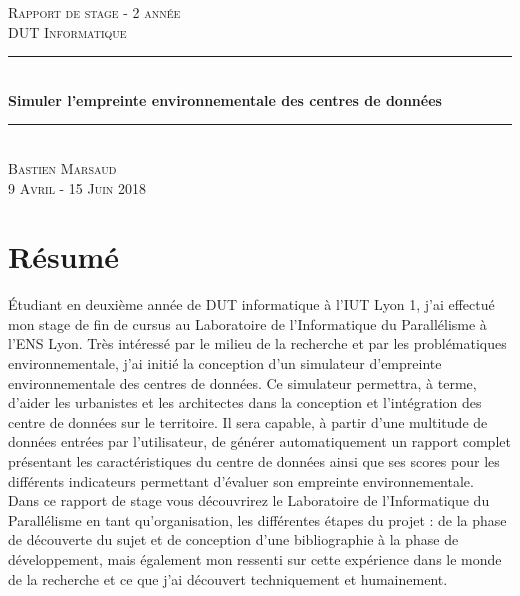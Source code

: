 \newpage\null\thispagestyle{empty}\newpage
\thispagestyle{licence}
\begin{spacing}{1}
	
	\newcommand{\HRule}{\rule{\linewidth}{0.5mm}}
	\begin{center}
		\textsc{\LARGE Rapport de stage - 2 année \\ DUT Informatique}\\
		\HRule \\[0.8cm]
		{ \huge \bfseries Simuler l'empreinte environnementale des centres de données}\\[0.4cm]
		\HRule \\[0.5cm]
		
		\textsc{\Large Bastien Marsaud}\\
		\textsc{\Large 9 Avril - 15 Juin 2018}\\
	\end{center}
	
	\hfill
	
	\section*{Résumé}
	Étudiant en deuxième année de DUT informatique à l'IUT Lyon 1, j'ai effectué mon stage de fin de cursus au Laboratoire de l'Informatique du Parallélisme à l'ENS Lyon. Très intéressé par le milieu de la recherche et par les problématiques environnementale, j'ai initié la conception d'un simulateur d'empreinte environnementale des centres de données. Ce simulateur permettra, à terme, d'aider les urbanistes et les architectes dans la conception et l'intégration des centre de données sur le territoire. Il sera capable, à partir d'une multitude de données entrées par l'utilisateur, de générer automatiquement un rapport complet présentant les caractéristiques du centre de données ainsi que ses scores pour les différents indicateurs permettant d'évaluer son empreinte environnementale.\\
	Dans ce rapport de stage vous découvrirez le Laboratoire de l'Informatique du Parallélisme en tant qu'organisation, les différentes étapes du projet : de la phase de découverte du sujet et de conception d'une bibliographie à la phase de développement, mais également mon ressenti sur cette expérience dans le monde de la recherche et ce que j'ai découvert techniquement et humainement.\\\\
	

\end{spacing}
